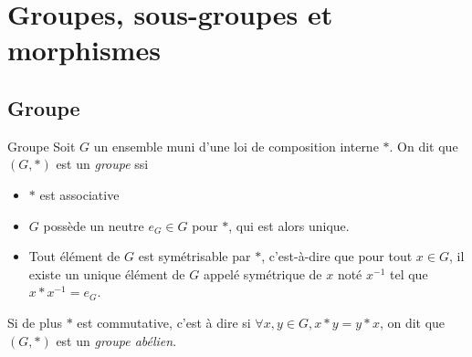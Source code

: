 \section{Groupes, sous-groupes et morphismes}
\subsection{Groupe}

\begin{definition}{Groupe}{}
    Soit $G$ un ensemble muni d'une loi de composition interne $\ast$. 
    On dit que $(G, \ast)$ est un \emph{groupe} ssi 
    \begin{itemize}
        \item $\ast$ est associative
        \item $G$ possède un neutre $e_G \in G$ pour $\ast$, qui est alors unique.
        \item Tout élément de $G$ est symétrisable par $\ast$, c'est-à-dire que pour tout $x \in G$, 
        il existe un unique élément de $G$ appelé symétrique de $x$ noté $x^{-1}$ tel que $x \ast x^{-1} = e_G$.
    \end{itemize}

    Si de plus $\ast$ est commutative, c'est à dire si $\forall x, y \in G, x \ast y = y \ast x$, 
    on dit que $(G, \ast)$ est un \emph{groupe abélien}.
\end{definition}

